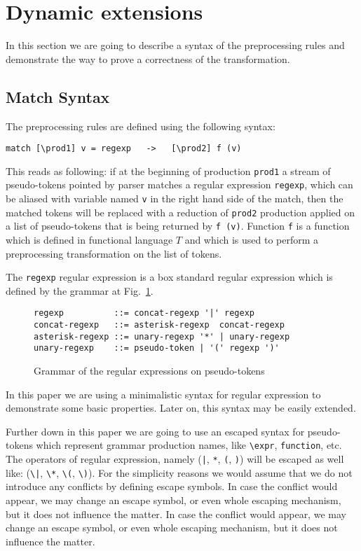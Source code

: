 \section{\label{sec:dynext}Dynamic extensions}

In this section we are going to describe a syntax of the preprocessing
rules and demonstrate the way to prove a correctness of the
transformation.

\subsection{Match Syntax}

The preprocessing rules are defined using the following syntax:
\begin{verbatim}
match [\prod1] v = regexp   ->   [\prod2] f (v)
\end{verbatim}
This reads as following: if at the beginning of production \verb|prod1|
a stream of pseudo-tokens pointed by parser matches a regular expression
\verb|regexp|, which can be aliased with variable named \verb|v| in the
right hand side of the match, then the matched tokens will be replaced 
with a reduction of \verb|prod2| production applied on a list of 
pseudo-tokens that is being returned by \verb|f (v)|.  Function \verb|f|
is a function which is defined in functional language $T$ and which
is used to perform a preprocessing transformation on the list of 
tokens.  

The \verb|regexp| regular expression is a box standard regular
expression which is defined by the grammar at Fig.~\ref{fig:reggram}.
\begin{figure}[h!]
\begin{verbatim}
regexp          ::= concat-regexp '|' regexp
concat-regexp   ::= asterisk-regexp  concat-regexp
asterisk-regexp ::= unary-regexp '*' | unary-regexp
unary-regexp    ::= pseudo-token | '(' regexp ')'
\end{verbatim}
\caption{\label{fig:reggram}Grammar of the regular expressions on
pseudo-tokens}
\end{figure}
In this paper we are using a minimalistic syntax for regular expression
to demonstrate some basic properties.  Later on, this syntax may be 
easily extended.

Further down in this paper we are going to use an escaped syntax 
for pseudo-tokens which represent grammar production names, like
\verb|\expr|, \verb|function|, etc.  The operators of regular
expression, namely (\verb/|/, \verb|*|, \verb|(|, \verb|)|) will
be escaped as well like: (\verb/\|/, \verb|\*|, \verb|\(|, \verb|\)|).
For the simplicity reasons we would assume that we do not introduce
any conflicts by defining escape symbols.  In case the conflict 
would appear, we may change an escape symbol, or even whole escaping
mechanism, but it does not influence the matter.  In case the conflict 
would appear, we may change an escape symbol, or even whole escaping
mechanism, but it does not influence the matter.

